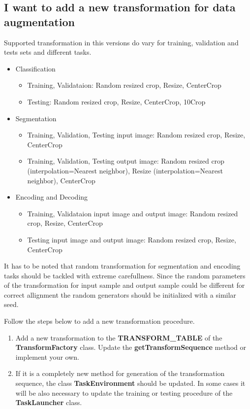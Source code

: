 \documentclass[a4paper, 11pt]{article}
\begin{document}
\subsection{I want to add a new transformation for data augmentation}
Supported transformation in this versions do vary for training, validation and tests sets and different tasks.

\begin{itemize}
\item Classification 
	\begin{itemize}
	\item Training, Validataion: Random resized crop, Resize, CenterCrop 
	\item Testing: Random resized crop, Resize, CenterCrop, 10Crop
	\end{itemize}
\item Segmentation
	\begin{itemize}
	\item Training, Validation, Testing input image: Random resized crop, Resize, CenterCrop 
	\item Training, Validation, Testing output image: Random resized crop (interpolation=Nearest neighbor), Resize (interpolation=Nearest neighbor), CenterCrop 
	\end{itemize}
\item Encoding and Decoding
	\begin{itemize}
	\item Training, Validataion input image and output image: Random resized crop, Resize, CenterCrop 
	\item Testing input image and output image: Random resized crop, Resize, CenterCrop
	\end{itemize}
\end{itemize}

It has to be noted that random transformation for segmentation and encoding tasks should be tackled with extreme carefullness. Since the random parameters of the transformation for input sample and output sample could be different for correct allignment the random generators should be initialized with a similar seed.

Follow the steps below to add a new transformation procedure.
\begin{enumerate}
\item Add a new transformation to the \textbf{TRANSFORM\_TABLE} of the \textbf{TransformFactory} class. Update the \textbf{getTransformSequence} method or implement your own.
\item If it is a completely new method for generation of the transformation sequence, the class \textbf{TaskEnvironment} should be updated. In some cases it will be also necessary to update the training or testing procedure of the \textbf{TaskLauncher} class.
\end{enumerate}
\end{document}

